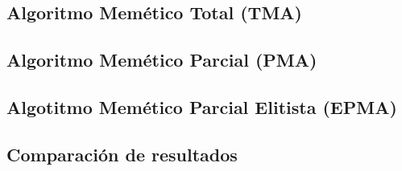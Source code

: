 \documentclass[a4paper, 11pt]{article}
\begin{document}
		\subsection{Algoritmo Memético Total (\textbf{TMA})}
			
			
			
		\subsection{Algoritmo Memético Parcial (\textbf{PMA})}
			
			
			
		\subsection{Algotitmo Memético Parcial Elitista (\textbf{EPMA})}
			
			
			
		\subsection{Comparación de resultados}
			
			
\end{document}

